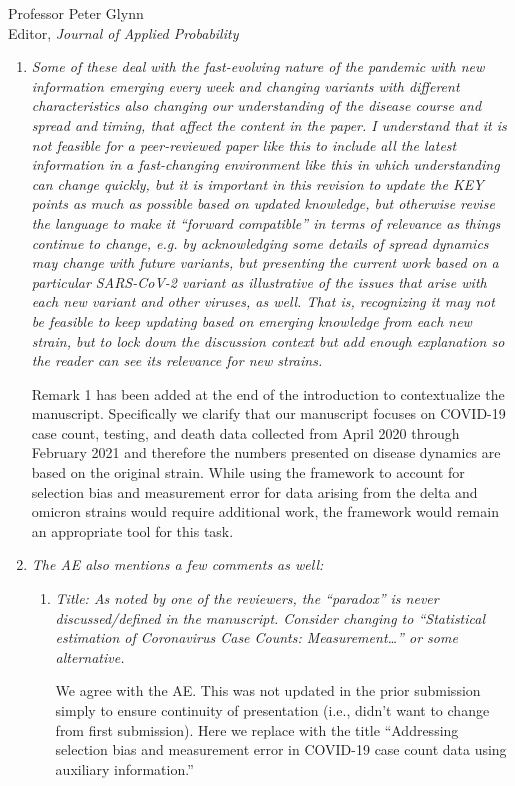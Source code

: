 \documentclass[11pt]{letter} %
\begin{document}
\begin{letter}{Professor
	Peter Glynn\\
	Editor, {\em Journal of Applied Probability}}
\begin{enumerate}
\item {\it Some of these deal with the fast-evolving nature of the pandemic with new information emerging every week and changing variants with different characteristics also changing our understanding of the disease course and spread and timing, that affect the content in the paper. I understand that it is not feasible for a peer-reviewed paper like this to include all the latest information in a fast-changing environment like this in which understanding can change quickly, but it is important in this revision to update the KEY points as much as possible based on updated knowledge, but otherwise revise the language to make it “forward compatible” in terms of relevance as things continue to change, e.g. by acknowledging some details of spread dynamics may change with future variants, but presenting the current work based on a particular SARS-CoV-2 variant as illustrative of the issues that arise with each new variant and other viruses, as well. That is, recognizing it may not be feasible to keep updating based on emerging knowledge from each new strain, but to lock down the discussion context but add enough explanation so the reader can see its relevance for new strains.}

\vspace{5mm}
Remark 1 has been added at the end of the introduction to contextualize the manuscript. Specifically we clarify that our manuscript focuses on COVID-19 case count, testing, and death data collected from April 2020 through February 2021 and therefore the numbers presented on disease dynamics are based on the original strain. While using the framework to account for selection bias and measurement error for data arising from the delta and omicron strains would require additional work, the framework would remain an appropriate tool for this task.
\vspace{5mm}

\item {\it The AE also mentions a few comments as well:}
\begin{enumerate}
	\item {\it Title: As noted by one of the reviewers, the “paradox” is never discussed/defined in the manuscript. Consider changing to “Statistical estimation of Coronavirus Case Counts: Measurement…” or some alternative.}
	\vspace{5mm}

	We agree with the AE. This was not updated in the prior submission simply to ensure continuity of presentation (i.e., didn’t want to change from first submission). Here we replace with the title ``Addressing selection bias and measurement error in COVID-19 case count data using auxiliary information.''
	\vspace{5mm}


\end{enumerate}
\end{enumerate}
\end{letter}
\end{document}
